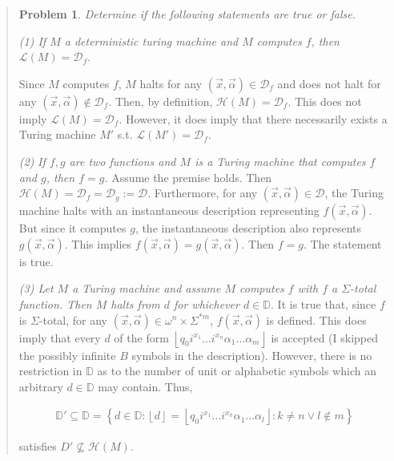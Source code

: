 \documentclass[a4paper, 12pt]{article}
\newtheorem{problem}{Problem}
\newtheorem{problem}{Problem}
\begin{document}
\small
\begin{quote}

\begin{problem}
    Determine if the following statements are true or false.
\end{problem}

\textit{(1) If $M$ a deterministic turing machine and $M$ computes $f$, then
$\mathcal{L}(M) = \mathcal{D}_f$}. 

Since $M$ computes $f$, $M$ halts for any
$(\vec{x}, \vec{\alpha}) \in \mathcal{D}_f$ and does not halt for any $(\vec{x},
\vec{\alpha}) \not\in \mathcal{D}_f$. Then, by definition, $\mathcal{H}(M) =
\mathcal{D}_f$. This does not imply $\mathcal{L}(M) = \mathcal{D}_f$. However,
it does imply that there necessarily exists a Turing machine $M'$ s.t.
$\mathcal{L}(M') = \mathcal{D}_f$.

\textit{(2)}  \textit{ If $f, g$ are two functions and $M$ is a Turing machine that
computes $f$ and $g$, then $f = g$.} Assume the premise holds. Then
$\mathcal{H}(M) = \mathcal{D}_f = \mathcal{D}_g := \mathcal{D}$. Furthermore, for any
$(\vec{x}, \vec{\alpha}) \in \mathcal{D}$, the Turing machine halts with an
instantaneous description representing $f (\vec{x}, \vec{\alpha}) $. But since
it computes $g$, the instantaneous description also represents $g (\vec{x},
\vec{\alpha}) $. This implies $f (\vec{x}, \vec{\alpha}) = g (\vec{x},
\vec{\alpha}) $. Then $f = g$. The statement is true.

\textit{(3) Let $M$ a Turing machine and assume $M$ computes $f$ with $f$ a
$\Sigma$-total function. Then $M$ halts from $d$ for whichever $d \in
\mathbb{D}$}. It is true that, since $f$ is $\Sigma$-total, for any $(\vec{x},
\vec{\alpha}) \in \omega^{n} \times \Sigma^{*m} $, $f (\vec{x}, \vec{\alpha}) $
is defined. This does imply that every $d$ of the form $\left\lfloor q_0 i^{x_1}\ldots i^{x_n} \alpha_1
\ldots \alpha_m \right\rfloor$ is accepted (I skipped the possibly infinite $B$
symbols in the description). However, there is no restriction in $\mathbb{D}$ as
to the number of unit or alphabetic symbols which an arbitrary $d \in
\mathbb{D}$ may contain. Thus,  

\begin{align*}
    \mathbb{D}' \subseteq \mathbb{D} = \left\{ d \in \mathbb{D} : \left\lfloor d
    \right\rfloor = \left\lfloor q_0 i^{x_1} \ldots i^{x_k} \alpha_1 \ldots
\alpha_l \right\rfloor : k \neq n \lor l \not\in m  \right\} 
\end{align*}

satisfies $D' \not\subseteq \mathcal{H}(M)$.


\end{quote}
\normalsize
\end{document}
